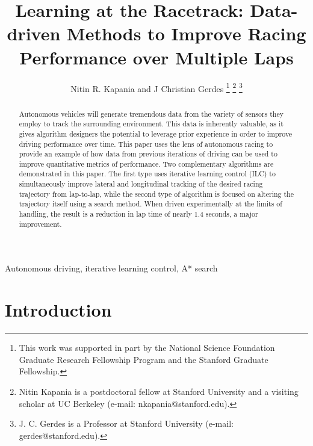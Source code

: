 \documentclass[9pt,shortpaper,twoside,web]{ieeecolor}
\begin{document}
\title{Learning at the Racetrack: Data-driven Methods to Improve Racing Performance over Multiple Laps}
\author{Nitin R. Kapania and J Christian Gerdes
\thanks{This work was supported in part by the National Science Foundation Graduate Research Fellowship Program and the Stanford Graduate Fellowship. }
\thanks{Nitin Kapania is a postdoctoral fellow at Stanford University and a visiting scholar at UC Berkeley (e-mail: nkapania@stanford.edu).}
\thanks{J. C. Gerdes is a Professor 
at Stanford University (e-mail: gerdes@stanford.edu).}}

\maketitle

\begin{abstract}
Autonomous vehicles will generate tremendous data from the variety of sensors they employ to track the surrounding environment. This data is inherently valuable, as it gives algorithm designers the potential to leverage prior experience in order to improve driving performance over time. This paper uses the lens of autonomous racing to provide an example of how data from previous iterations of driving can be used to improve quantitative metrics of performance. Two complementary algorithms are demonstrated in this paper. The first type uses iterative learning control (ILC) to simultaneously improve lateral and longitudinal tracking of the desired racing trajectory from lap-to-lap, while the second type of algorithm is focused on altering the trajectory itself using a search method. When driven experimentally at the limits of handling, the result is a reduction in lap time of nearly 1.4 seconds, a major improvement.    

\end{abstract}

\begin{IEEEkeywords}
 Autonomous driving, iterative learning control, A* search
\end{IEEEkeywords}

\section{Introduction}
\label{sec:introduction}
\end{document}
